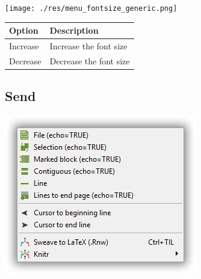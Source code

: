 \texttt{[image: ./res/menu\_fontsize\_generic.png]}\\

\begin{scriptsize}
  \begin{tabularx}{\textwidth}{>{\hsize=0.3\hsize}X>{\hsize=0.7\hsize}X}\\
    \hline
    \textbf{Option} & \textbf{Description} \\
    \hline
    Increase & Increase the font size \\
    Decrease & Decrease the font size \\
    \hline
  \end{tabularx}
\end{scriptsize}


\hypertarget{menu_r_send}{}
\subsection{Send}

\includegraphics[scale=0.50]{./res/menu_r_send.png}\\

